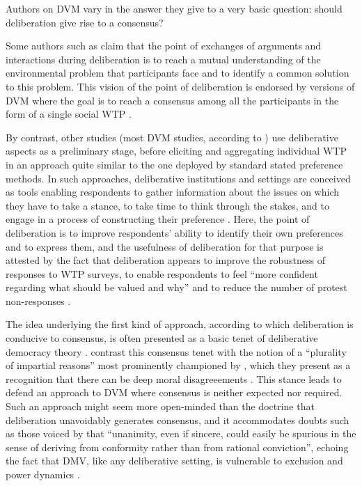 \documentclass[version=3.21, pagesize, twoside=off, bibliography=totoc, DIV=calc, fontsize=12pt, a4paper, french, english]{scrartcl}
\begin{document}
Authors on DVM vary in the answer they give to a very basic question: should deliberation give rise to a consensus?

Some authors such as \citet{vatn_institutional_2009} claim that the point of exchanges of arguments and interactions during deliberation is to reach a mutual understanding of the environmental problem that participants face and to identify a common solution to this problem. 
This vision of the point of deliberation is endorsed by versions of DVM where the goal is to reach a consensus among all the participants in the form of a single social WTP \citep{orchard-webb_deliberative_2016}.

By contrast, other studies (most DVM studies, according to \citet{bunse_what_2015}) use deliberative aspects as a preliminary stage, before eliciting and aggregating individual WTP in an approach quite similar to the one deployed by standard stated preference methods. 
In such approaches, deliberative institutions and settings are conceived as tools enabling respondents to gather information about the issues on which they have to take a stance, to take time to think through the stakes, and to engage in a process of constructing their preference \citep{braga_preference_2005}. 
Here, the point of deliberation is to improve respondents' ability to identify their own preferences and to express them, and the usefulness of deliberation for that purpose is attested by the fact that deliberation appears to improve the robustness of responses to WTP surveys, to enable respondents to feel ``more confident regarding what should be valued and why'' \citep[p. 125, cited by \citet{bartkowski_beyond_2018}]{svedsater_economic_2003} and to reduce the number of protest non-responses \citep{szabo_reducing_2011}.

The idea underlying the first kind of approach, according to which deliberation is conducive to consensus, is often presented as a basic tenet of deliberative democracy theory \citep{wilson_discourse-based_2002}. 
\citet{bartkowski_beyond_2018} contrast this consensus tenet with the notion of a ``plurality of impartial reasons'' most prominently championed by \citet{sen_idea_2009}, which they present as a recognition that there can be deep moral disagreeements \citep{dryzek_deliberative_2013}. 
This stance leads \citet{bartkowski_beyond_2018} to defend an approach to DVM where consensus is neither expected nor required. 
Such an approach might seem more open-minded than the doctrine that deliberation unavoidably generates consensus, and it accommodates doubts such as those voiced by \citet{elster_sour_1983} that ``unanimity, even if sincere, could easily be spurious in the sense of deriving from conformity rather than from rational conviction'', echoing the fact that DMV, like any deliberative setting, is vulnerable to exclusion and power dynamics \citep{volker_exploring_2016,vargas_background_2016,vargas_problem_2017}. 
\end{document}
